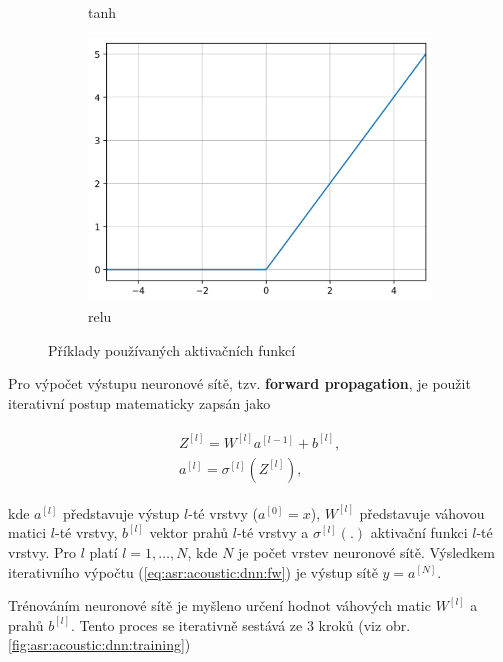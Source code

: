 \begin{figure}[htpb]
\begin{subfigure}[b]{0.3\textwidth}
    \caption{tanh}
    \label{fig:asr:acoustic:dnn:activation:tanh}
  \end{subfigure}
  \begin{subfigure}[b]{0.28\textwidth}
    \includegraphics[width=\textwidth]{./ch4-asr/img/relu.png}
    \caption{relu}
    \label{fig:asr:acoustic:dnn:activation:relu}
  \end{subfigure}
  \caption{Příklady používaných aktivačních funkcí}
  \label{fig:asr:acoustic:dnn:activation}
\end{figure}

Pro výpočet výstupu neuronové sítě, tzv. \textbf{forward propagation}, je použit iterativní postup matematicky zapsán jako

\begin{align}
  \begin{split}
    Z^{[l]} = W^{[l]}a^{[l-1]} + b^{[l]}, \\
    a^{[l]} = \sigma^{[l]}\left(Z^{[l]}\right),
  \end{split}
  \label{eq:asr:acoustic:dnn:fw}
\end{align}

\noindent kde $a^{[l]}$ představuje výstup $l$-té vrstvy ($a^{[0]} = x$), $W^{[l]}$ představuje váhovou matici $l$-té vrstvy, $b^{[l]}$ vektor prahů $l$-té vrstvy a $\sigma^{[l]}(.)$ aktivační funkci $l$-té vrstvy. Pro $l$ platí $l = 1, \dots, N$, kde $N$ je počet vrstev neuronové sítě. Výsledkem iterativního výpočtu (\ref{eq:asr:acoustic:dnn:fw}) je výstup sítě $y = a^{[N]}$.

Trénováním neuronové sítě je myšleno určení hodnot váhových matic $W^{[l]}$ a prahů $b^{[l]}$. Tento proces se iterativně sestává ze 3 kroků (viz obr. \ref{fig:asr:acoustic:dnn:training})

